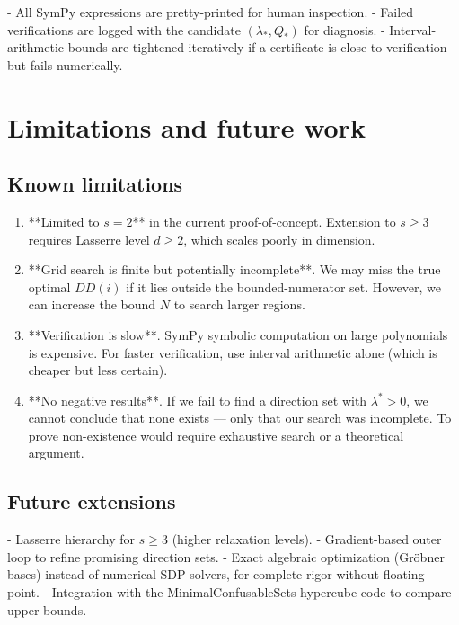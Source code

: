 \documentclass[12pt,a4paper]{article}
\begin{document}
- All SymPy expressions are pretty-printed for human inspection.
- Failed verifications are logged with the candidate $(\lambda_*, Q_*)$ for diagnosis.
- Interval-arithmetic bounds are tightened iteratively if a certificate is close to
  verification but fails numerically.

\section{Limitations and future work}
\label{sec:limitations}

\subsection*{Known limitations}

\begin{enumerate}
  \item **Limited to $s=2$** in the current proof-of-concept.  Extension to $s \geq 3$
    requires Lasserre level $d \geq 2$, which scales poorly in dimension.

  \item **Grid search is finite but potentially incomplete**.  We may miss the true
    optimal $DD(i)$ if it lies outside the bounded-numerator set.  However, we can increase
    the bound $N$ to search larger regions.

  \item **Verification is slow**.  SymPy symbolic computation on large polynomials is
    expensive.  For faster verification, use interval arithmetic alone (which is cheaper
    but less certain).

  \item **No negative results**.  If we fail to find a direction set with $\lambda^* > 0$,
    we cannot conclude that none exists — only that our search was incomplete.  To prove
    non-existence would require exhaustive search or a theoretical argument.
\end{enumerate}

\subsection*{Future extensions}

- Lasserre hierarchy for $s \geq 3$ (higher relaxation levels).
- Gradient-based outer loop to refine promising direction sets.
- Exact algebraic optimization (Gröbner bases) instead of numerical SDP solvers, for
  complete rigor without floating-point.
- Integration with the MinimalConfusableSets hypercube code to compare upper bounds.
\end{document}
